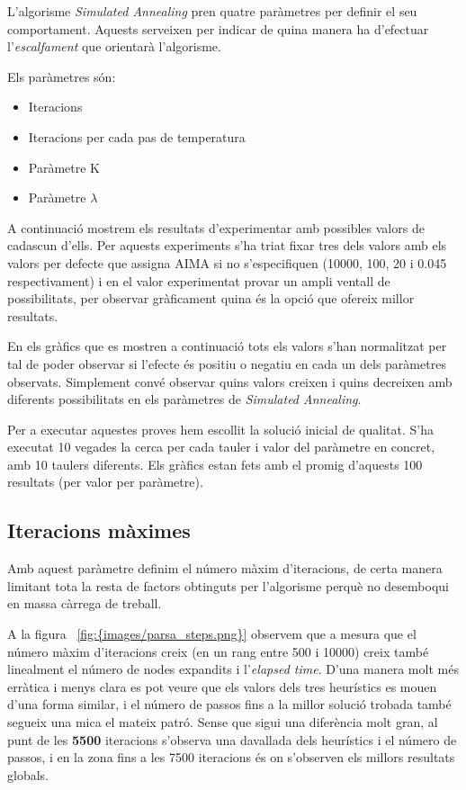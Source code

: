 
L'algorisme \emph{Simulated Annealing} pren quatre paràmetres per definir el seu comportament. Aquests serveixen per indicar de quina manera ha d'efectuar l'\emph{escalfament} que orientarà l'algorisme.

Els paràmetres són:

\begin{itemize}
	\item Iteracions
	\item Iteracions per cada pas de temperatura
	\item Paràmetre K
	\item Paràmetre $\lambda$
\end{itemize}

A continuació mostrem els resultats d'experimentar amb possibles valors de cadascun d'ells. Per aquests experiments s'ha triat fixar tres dels valors amb els valors per defecte que assigna AIMA si no s'especifiquen (10000, 100, 20 i 0.045 respectivament) i en el valor experimentat provar un ampli ventall de possibilitats, per observar gràficament quina és la opció que ofereix millor resultats.

En els gràfics que es mostren a continuació tots els valors s'han normalitzat per tal de poder observar si l'efecte és positiu o negatiu en cada un dels paràmetres observats. Simplement convé observar quins valors creixen i quins decreixen amb diferents possibilitats en els paràmetres de \emph{Simulated Annealing}.

Per a executar aquestes proves hem escollit la solució inicial de qualitat. S'ha executat 10 vegades la cerca per cada tauler i valor del paràmetre en concret, amb 10 taulers diferents. Els gràfics estan fets amb el promig d'aquests 100 resultats (per valor per paràmetre).

\newpage
\subsection{Iteracions màximes} %
\label{sub:iteracions}

Amb aquest paràmetre definim el número màxim d'iteracions, de certa manera limitant tota la resta de factors obtinguts per l'algorisme perquè no desemboqui en massa càrrega de treball.


A la figura ~\ref{fig:{images/parsa_steps.png}} observem que a mesura que el número màxim d'iteracions creix (en un rang entre 500 i 10000) creix també linealment el número de nodes expandits i l'\emph{elapsed time}. D'una manera molt més erràtica i menys clara es pot veure que els valors dels tres heurístics es mouen d'una forma similar, i el número de passos fins a la millor solució trobada també segueix una mica el mateix patró. Sense que sigui una diferència molt gran, al punt de les \textbf{5500} iteracions s'observa una davallada dels heurístics i el número de passos, i en la zona fins a les 7500 iteracions és on s'observen els millors resultats globals.

